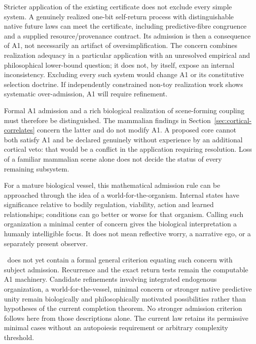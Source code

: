 Stricter application of the existing certificate does not exclude every simple system. A genuinely realized one-bit self-return process with distinguishable native future laws can meet the certificate, including predictive-fibre congruence and a supplied resource/provenance contract. Its admission is then a consequence of A1, not necessarily an artifact of oversimplification. The concern combines realization adequacy in a particular application with an unresolved empirical and philosophical lower-bound question; it does not, by itself, expose an internal inconsistency. Excluding every such system would change A1 or its constitutive selection doctrine. If independently constrained non-toy realization work shows systematic over-admission, A1 will require refinement.

Formal A1 admission and a rich biological realization of scene-forming coupling must therefore be distinguished. The mammalian findings in Section~\ref{sec:cortical-correlates} concern the latter and do not modify A1. A proposed core cannot both satisfy A1 and be declared genuinely without experience by an additional cortical veto: that would be a conflict in the application requiring resolution. Loss of a familiar mammalian scene alone does not decide the status of every remaining subsystem.



For a mature biological vessel, this mathematical admission rule can be approached through the idea of a world-for-the-organism. Internal states have significance relative to bodily regulation, viability, action and learned relationships; conditions can go better or worse for that organism. Calling such organization a minimal center of concern gives the biological interpretation a humanly intelligible focus. It does not mean reflective worry, a narrative ego, or a separately present observer.

\spctwo\ does not yet contain a formal general criterion equating such concern with subject admission. Recurrence and the exact return tests remain the computable A1 machinery. Candidate refinements involving integrated endogenous organization, a world-for-the-vessel, minimal concern or stronger native predictive unity remain biologically and philosophically motivated possibilities rather than hypotheses of the current completion theorem. No stronger admission criterion follows here from those descriptions alone. The current law retains its permissive minimal cases without an autopoiesis requirement or arbitrary complexity threshold.

